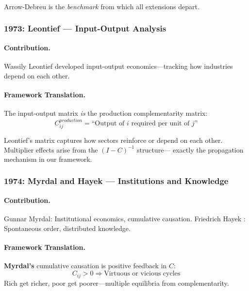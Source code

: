 Arrow-Debreu is the \emph{benchmark} from which all extensions depart.

\subsubsection{1973: Leontief --- Input-Output Analysis}

\paragraph{Contribution.}
Wassily Leontief developed input-output economics---tracking how
industries depend on each other.

\paragraph{Framework Translation.}
The input-output matrix \emph{is} the production complementarity matrix:
\begin{equation}
  C^{production}_{ij} = \text{``Output of } i \text{ required per unit of } j\text{''}
\end{equation}

Leontief's matrix captures how sectors reinforce or depend on each other.
Multiplier effects arise from the $(I - C)^{-1}$ structure---
exactly the propagation mechanism in our framework.

\subsubsection{1974: Myrdal and Hayek --- Institutions and Knowledge}

\paragraph{Contribution.}
Gunnar Myrdal: Institutional economics, cumulative causation.
Friedrich Hayek \citep{hayek1945}: Spontaneous order, distributed knowledge.

\paragraph{Framework Translation.}
\textbf{Myrdal's} cumulative causation is positive feedback in $C$:
\begin{equation}
  C_{ij} > 0 \Rightarrow \text{Virtuous or vicious cycles}
\end{equation}
Rich get richer, poor get poorer---multiple equilibria from complementarity.

